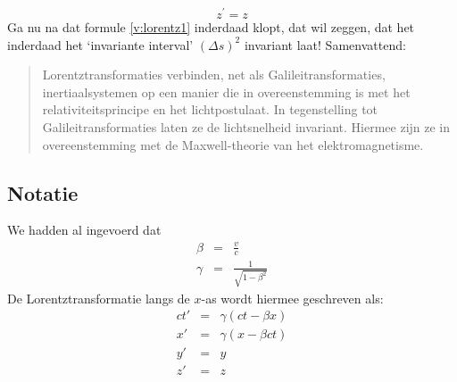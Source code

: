 \begin{displaymath}
z^{'} = z
\end{displaymath}
Ga nu na dat formule \ref{v:lorentz1} inderdaad klopt, dat wil zeggen, dat het inderdaad het `invariante interval' $(\Delta s)^2$ invariant laat! Samenvattend:
\begin{quote}
Lorentztransformaties verbinden, net als Galileitransformaties,
inertiaalsystemen op een manier die in overeenstemming is met het
relativiteitsprincipe en het lichtpostulaat. In tegenstelling tot
Galileitransformaties laten ze de lichtsnelheid invariant. Hiermee
zijn ze in overeenstemming met de Maxwell-theorie van het
elektromagnetisme.
\end{quote}

\subsection{Notatie}
We hadden al ingevoerd dat 
\begin{eqnarray}
\beta & = & \frac{v}{c} \\
\gamma & = & \frac{1}{\sqrt{1-\beta^2}}
\end{eqnarray}
De Lorentztransformatie langs de $x$-as wordt hiermee geschreven als:
\begin{eqnarray}
\label{v:lorentz11}
ct' &  = & \gamma (ct - \beta x) \\ \label{v:lorentz10}
x'  &  = & \gamma (x -  \beta ct)\\
y'  & = & y \\
z' & = & z 
\end{eqnarray}
